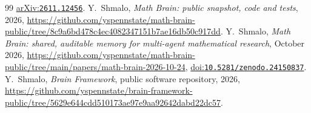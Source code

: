 \documentclass[11pt]{amsart}
\theoremstyle{remark}
\newcommand{\doi}[1]{\href{https://doi.org/#1}{doi:\nolinkurl{#1}}}
\newcommand{\arxiv}[1]{\href{https://arxiv.org/abs/#1}{arXiv:\nolinkurl{#1}}}
\begin{document}
\begin{thebibliography}{99}
\arxiv{2611.12456}.
 Y.~Shmalo, \emph{Math Brain: public snapshot, code and tests}, 2026,
\url{https://github.com/yspennstate/math-brain-public/tree/8c9a6bd478c4ec4082347151b7ae16db50c917dd}.
 Y.~Shmalo, \emph{Math Brain: shared, auditable memory for multi-agent mathematical research},
October 2026, \url{https://github.com/yspennstate/math-brain-public/tree/main/papers/math-brain-2026-10-24},
\doi{10.5281/zenodo.24150837}.
 Y.~Shmalo, \emph{Brain Framework}, public software repository, 2026,
\url{https://github.com/yspennstate/brain-framework-public/tree/5629e644cdd510173ae97e9aa92642dabd22dc57}.
\end{thebibliography}
\end{document}
